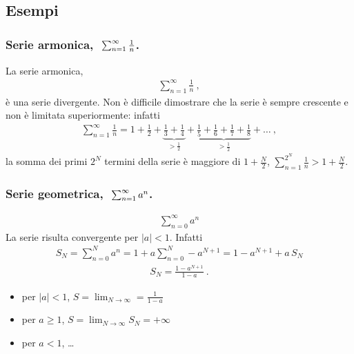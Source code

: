 \documentclass[letterpaper,10pt,italian]{jupyterBook}
\begin{document}
\subsection{Esempi}
\label{\detokenize{ch/series:esempi}}\subsubsection*{Serie armonica, \protect\(\ \sum_{n=1}^{\infty} \frac{1}{n}\protect\).}

\sphinxAtStartPar
La serie armonica,
\begin{equation*}
\begin{split}\sum_{n=1}^{\infty} \frac{1}{n} \ ,\end{split}
\end{equation*}
\sphinxAtStartPar
è una serie divergente. Non è difficile dimostrare che la serie è sempre crescente e non è limitata superiormente: infatti
\begin{equation*}
\begin{split}\sum_{n=1}^{\infty} \frac{1}{n} = 1 + \frac{1}{2} + \underbrace{\frac{1}{3} + \frac{1}{4}}_{> \frac{1}{2}} + \underbrace{\frac{1}{5} + \frac{1}{6} + \frac{1}{7} + \frac{1}{8}}_{> \frac{1}{2}} + \dots \ ,\end{split}
\end{equation*}
\sphinxAtStartPar
la somma dei primi \(2^N\) termini della serie è maggiore di \(1 + \frac{N}{2}\), \(\sum_{n=1}^{2^N} \frac{1}{n} > 1 + \frac{N}{2}\).
\subsubsection*{Serie geometrica, \protect\(\ \sum_{n=1}^{\infty} a^n\protect\).}
\begin{equation*}
\begin{split}\sum_{n=0}^{\infty} a^n\end{split}
\end{equation*}
\sphinxAtStartPar
La serie risulta convergente per \(|a|<1\). Infatti
\begin{equation*}
\begin{split}S_N = \sum_{n=0}^{N} a^n = 1 + a \sum_{n=0}^{N} - a^{N+1} = 1 - a^{N+1} + a \, S_N\end{split}
\end{equation*}\begin{equation*}
\begin{split}S_N = \frac{1 - a^{N+1}}{1-a} \ .\end{split}
\end{equation*}\begin{itemize}
\item {} 
\sphinxAtStartPar
per \(|a| < 1\), \(S = \lim_{N \rightarrow \infty} = \frac{1}{1 - a}\)

\item {} 
\sphinxAtStartPar
per \(a \ge 1\), \(S = \lim_{N \rightarrow \infty} S_N = +\infty\)

\item {} 
\sphinxAtStartPar
per \(a<1\), …

\end{itemize}
\end{document}

